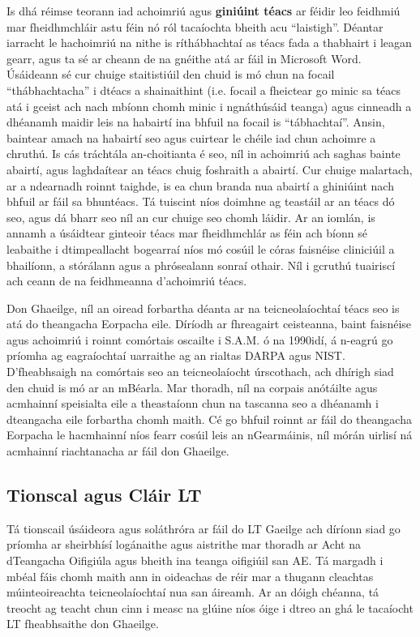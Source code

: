 \documentclass[]{../../metanetpaper}
\begin{document}
\begin{multicols}{2}
Is dhá réimse teorann iad achoimriú agus \textbf{giniúint téacs} ar féidir leo feidhmiú mar fheidhmchláir astu féin nó ról tacaíochta bheith acu ``laistigh''. Déantar iarracht le hachoimriú na nithe is ríthábhachtaí as téacs fada a thabhairt i leagan gearr, agus ta sé ar cheann de na gnéithe atá ar fáil in Microsoft Word.  Úsáideann sé cur chuige staitistiúil den chuid is mó chun na focail ``thábhachtacha'' i dtéacs a shainaithint (i.e. focail a fheictear go minic sa téacs atá i gceist ach nach mbíonn chomh minic i ngnáthúsáid teanga) agus cinneadh a dhéanamh maidir leis na habairtí ina bhfuil na focail is ``tábhachtaí''. Ansin, baintear amach na habairtí seo agus cuirtear le chéile iad chun achoimre a chruthú. Is cás tráchtála an-choitianta é seo, níl in achoimriú ach saghas bainte abairtí, agus laghdaítear an téacs chuig foshraith a abairtí. Cur chuige malartach, ar a ndearnadh roinnt taighde, is ea chun branda nua abairtí a ghiniúint nach bhfuil ar fáil sa bhuntéacs. Tá tuiscint níos doimhne ag teastáil ar an téacs dó seo, agus dá bharr seo níl an cur chuige seo chomh láidir. Ar an iomlán, is annamh a úsáidtear ginteoir téacs mar fheidhmchlár as féin ach bíonn sé leabaithe i dtimpeallacht bogearraí níos mó cosúil le córas faisnéise cliniciúil a bhailíonn, a stórálann agus a phrósealann sonraí othair.  Níl i gcruthú tuairiscí ach ceann de na feidhmeanna d’achoimriú téacs.  

Don Ghaeilge, níl an oiread forbartha déanta ar na teicneolaíochtaí téacs seo is atá do theangacha Eorpacha eile. Díríodh ar fhreagairt ceisteanna, baint faisnéise agus achoimriú i roinnt comórtais oscailte i S.A.M. ó na 1990idí, á n-eagrú go príomha ag eagraíochtaí uarraithe ag an rialtas DARPA agus NIST. D’fheabhsaigh na comórtais seo an teicneolaíocht úrscothach, ach dhírigh siad den chuid is mó ar an mBéarla. Mar thoradh, níl na corpais anótáilte agus acmhainní speisialta eile a theastaíonn chun na tascanna seo a dhéanamh i dteangacha eile forbartha chomh maith. Cé go bhfuil roinnt ar fáil do theangacha Eorpacha le hacmhainní níos fearr cosúil leis an nGearmáinis, níl mórán uirlisí ná acmhainní riachtanacha ar fáil don Ghaeilge.

\subsection{Tionscal agus Cláir LT}

Tá tionscail úsáideora agus soláthróra ar fáil do LT Gaeilge ach díríonn siad go príomha ar sheirbhísí logánaithe agus aistrithe mar thoradh ar Acht na dTeangacha Oifigiúla agus bheith ina teanga oifigiúil san AE. Tá margadh i mbéal fáis chomh maith ann in oideachas de réir mar a thugann cleachtas múinteoireachta teicneolaíochtaí nua san áireamh. Ar an dóigh chéanna, tá treocht ag teacht chun cinn i measc na glúine níos óige i dtreo an ghá le tacaíocht LT fheabhsaithe don Ghaeilge.


\end{multicols}
\end{document}
